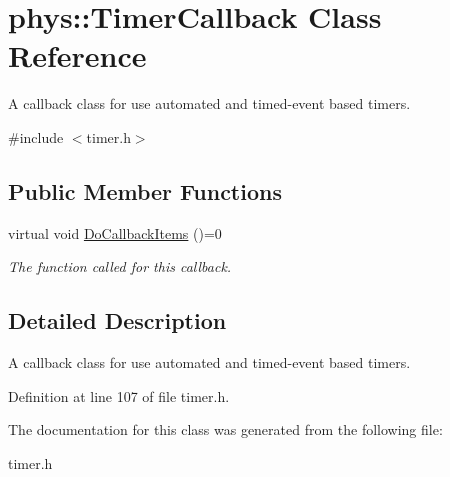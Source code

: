 \hypertarget{classphys_1_1TimerCallback}{
\section{phys::TimerCallback Class Reference}
\label{d1/d18/classphys_1_1TimerCallback}
}


A callback class for use automated and timed-\/event based timers.  




{\ttfamily \#include $<$timer.h$>$}

\subsection*{Public Member Functions}
\begin{DoxyCompactItemize}
\item 
\hypertarget{classphys_1_1TimerCallback_a8ceb51cd1b902e243e35cff61f4ae9d9}{
virtual void \hyperlink{classphys_1_1TimerCallback_a8ceb51cd1b902e243e35cff61f4ae9d9}{DoCallbackItems} ()=0}
\label{d1/d18/classphys_1_1TimerCallback_a8ceb51cd1b902e243e35cff61f4ae9d9}

\begin{DoxyCompactList}\small\item\em The function called for this callback. \item\end{DoxyCompactList}\end{DoxyCompactItemize}


\subsection{Detailed Description}
A callback class for use automated and timed-\/event based timers. 

Definition at line 107 of file timer.h.



The documentation for this class was generated from the following file:\begin{DoxyCompactItemize}
\item 
timer.h\end{DoxyCompactItemize}

